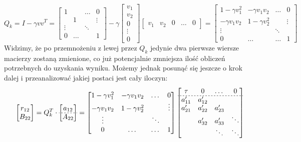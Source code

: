 \documentclass[a4paper]{article}
\begin{document}
$$Q_k=I-\gamma vv^T=\begin{bmatrix}
1 &  & \dots & 0 \\
& 1 &  & \vdots \\
\vdots &  & \ddots &  \\
0 & \dots &  & 1
\end{bmatrix} - \gamma  \begin{bmatrix}
v_1 \\
v_2 \\
0 \\
\vdots \\
0
\end{bmatrix}   \begin{bmatrix}
v_1 & v_2 & 0 & \dots & 0
\end{bmatrix} =
\begin{bmatrix}
	1 - \gamma v_1^2 & -\gamma v_1v_2   & \dots  & 0      \\
	-\gamma v_1v_2   & 1 - \gamma v_2^2 &        & \vdots \\
	\vdots           &                  & \ddots &        \\
	0                & \dots            & \dots  & 1
\end{bmatrix}$$
Widzimy, że po przemnożeniu z lewej przez $Q_k$ jedynie dwa pierwsze wiersze macierzy zostaną zmienione, co już potencjalnie zmniejsza ilość obliczeń potrzebnych do uzyskania wyniku. Możemy jednak posunąć się jeszcze o krok dalej i przeanalizować jakiej postaci jest cały iloczyn:
$$\begin{bmatrix}
r_{12} \\
B_{22}
\end{bmatrix} = Q_{k}^{T} \cdot \begin{bmatrix}
a_{12} \\ \hdashline[2pt/2pt]
A_{22}
\end{bmatrix} =
\begin{bmatrix}
	1 - \gamma v_1^2 & -\gamma v_1v_2   & \dots  & 0      \\
	-\gamma v_1v_2   & 1 - \gamma v_2^2 &        & \vdots \\
	\vdots           &                  & \ddots &        \\
	0                & \dots            & \dots  & 1
\end{bmatrix}
\begin{bmatrix}
	\tau    & 0       & \dots   & 0      \\ \hdashline[2pt/2pt]
	a'_{11} & a'_{12} &         &        \\
	a'_{21} & a'_{22} & a'_{23} &        \\
	        & a'_{32} & a'_{33} & \ddots \\
	        &         & \ddots  & \ddots
\end{bmatrix}
$$
\end{document}
